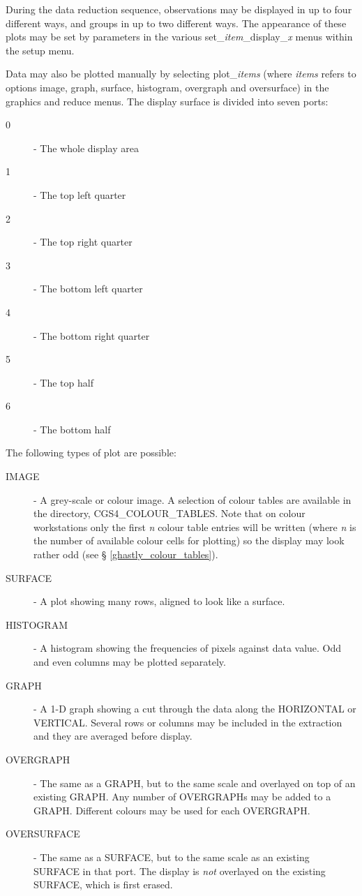 {During the data reduction sequence, observations may be displayed in up 
to four different ways, and groups in up to two different ways.
The appearance of these plots may be set by parameters in the
various {\sf set\_{\em item}\_display\_{\em x}} menus within the 
{\sf setup} menu.

Data may also be plotted manually by selecting {\sf plot\_{\em items}}
(where {\em items} refers to options {\sf image}, {\sf graph}, {\sf surface},
{\sf histogram}, {\sf overgraph} and {\sf oversurface})
in the graphics and reduce menus. The display surface is divided into seven 
ports:

\begin{description}
\item[0] - The whole display area
\item[1] - The top left quarter
\item[2] - The top right quarter
\item[3] - The bottom left quarter
\item[4] - The bottom right quarter
\item[5] - The top half
\item[6] - The bottom half
\end{description}

The following types of plot are possible:

\begin{description}
\item[{\sf IMAGE}] - A grey-scale or colour image. A selection of colour 
  tables are available in the directory, {\sf CGS4\_COLOUR\_TABLES}. Note 
  that on colour workstations only the first {\em n} colour table entries 
  will be written (where {\em n} is the number of available colour cells 
  for plotting) so the display may look rather odd (see \S 
  \ref{ghastly_colour_tables}).
\item[{\sf SURFACE}] - A plot showing many rows, aligned to look like a 
  surface.
\item[{\sf HISTOGRAM}] - A histogram showing the frequencies of pixels against 
  data value. Odd and even columns may be plotted separately.
\item[{\sf GRAPH}] - A 1-D graph showing a cut through the data along the 
  {\sf HORIZONTAL} or {\sf VERTICAL}. Several rows or columns may be 
  included in the extraction and they are averaged before display.
\item[{\sf OVERGRAPH}] - The same as a GRAPH, but to the same scale and 
  overlayed on top of an existing GRAPH. Any number of OVERGRAPHs may be 
  added to a GRAPH. Different colours may be used for each OVERGRAPH.
\item[{\sf OVERSURFACE}] - The same as a SURFACE, but to the same scale as an 
  existing SURFACE in that port. The display is {\em not} overlayed on the 
  existing SURFACE, which is first erased.
\end{description}

}
